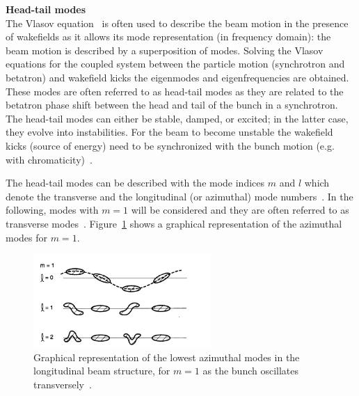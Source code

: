 
\textbf{Head-tail modes}\\
The Vlasov equation~\cite{Vlasov:426186} is often used to describe the beam motion in the presence of wakefields as it allows its mode representation (in frequency domain): the beam motion is described by a superposition of modes. %
Solving the Vlasov equations for the coupled system between the particle motion (synchrotron and betatron) and wakefield kicks the eigenmodes and eigenfrequencies are obtained. These modes are often referred to as head-tail modes as they are related to the betatron phase shift between the head and tail of the bunch in a synchrotron. The head-tail modes can either be stable, damped, or excited; in the latter case, they evolve into instabilities. For the beam to become unstable the wakefield kicks (source of energy) need to be synchronized with the bunch motion (e.g. with chromaticity)~\cite{instabilities_rumulo_li}.

The head-tail modes can be described with the mode indices $m$ and $l$ which denote the transverse and the longitudinal (or azimuthal) mode numbers~\cite{Chao:collective}. In the following, modes with $m=1$ will be considered and they are often referred to as transverse modes~\cite{Chao:collective}. Figure~\ref{fig:azimuthal_mode} shows a graphical representation of the azimuthal modes for $m=1$.

\begin{figure}[!h] %
    \centering         
    \includegraphics[width=0.6\textwidth]{images/Ch2/transverse_mode_l.png}
        \caption{Graphical representation of the lowest azimuthal modes in the longitudinal beam structure, for $m=1$ as the bunch oscillates transversely~\cite{Chao:collective}. } 
        \label{fig:azimuthal_mode}
 \end{figure}
 
